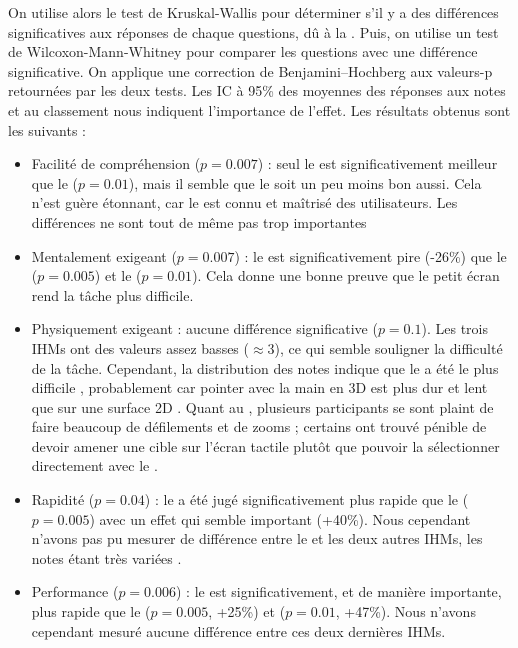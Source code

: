 On utilise alors le test de Kruskal-Wallis pour déterminer s'il y a des différences significatives aux réponses de chaque questions, dû à la . Puis, on utilise un test de Wilcoxon-Mann-Whitney pour comparer les questions avec une différence significative. On applique une correction de Benjamini–Hochberg aux valeurs-p retournées par les deux tests. Les IC à 95\% des moyennes des réponses aux notes  et au classement  nous indiquent l'importance de l'effet. Les résultats obtenus sont les suivants :
\begin{itemize}
  \item Facilité de compréhension ($p = \num{0.007}$) : seul le  est significativement meilleur que le  ($p = \num{0.01}$), mais il semble que le  soit un peu moins bon aussi. Cela n'est guère étonnant, car le  est connu et maîtrisé des utilisateurs. Les différences ne sont tout de même pas trop importantes
  \item Mentalement exigeant ($p = \num{0.007}$) : le  est significativement pire (-26\%) que le  ($p = \num{0.005}$) et le  ($p = \num{0.01}$). Cela donne une bonne preuve que le petit écran rend la tâche plus difficile.
  \item Physiquement exigeant : aucune différence significative ($p = \num{0.1}$). Les trois IHMs ont des valeurs assez basses ($\approx$3), ce qui semble souligner la difficulté de la tâche. Cependant, la distribution des notes indique que le  a été le plus difficile , probablement car pointer avec la main en 3D est plus dur et lent que sur une surface 2D \citep{Argelaguet2013}. Quant au , plusieurs participants se sont plaint de faire beaucoup de défilements et de zooms ; certains ont trouvé pénible de devoir amener une cible sur l'écran tactile plutôt que pouvoir la sélectionner directement avec le .
  \item Rapidité ($p = \num{0.04}$) : le  a été jugé significativement plus rapide que le  ($p = \num{0.005}$) avec un effet qui semble important (+40\%). Nous cependant n'avons pas pu mesurer de différence entre le  et les deux autres IHMs, les notes étant très variées .
  \item Performance ($p = \num{0.006}$) : le  est significativement, et de manière importante, plus rapide que le  ($p = \num{0.005}$, +25\%) et  ($p = \num{0.01}$, +47\%). Nous n'avons cependant mesuré aucune différence entre ces deux dernières IHMs.

\end{itemize}

